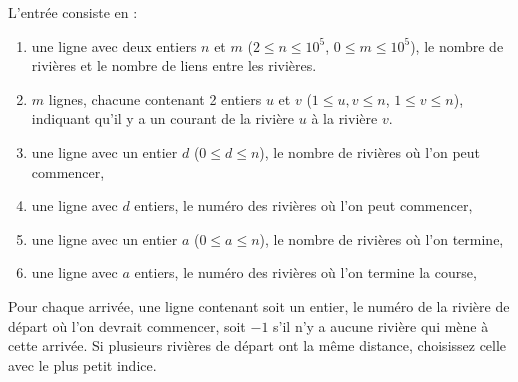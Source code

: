 \begin{Input}
    L'entrée consiste en :
    \begin{enumerate}
        \item une ligne avec deux entiers $n$ et $m$ ($2 \le n \le 10^5$, $0 \le m \le 10^5$), le nombre de rivières et le nombre de liens entre les rivières.
        \item $m$ lignes, chacune contenant 2 entiers $u$ et $v$ ($1 \le u,v \le n$, $1 \le v \le n$), indiquant qu'il y a un courant de la rivière $u$ à la rivière $v$.
        \item une ligne avec un entier $d$ ($0 \le d \le n$), le nombre de rivières où l'on peut commencer,
        \item une ligne avec $d$ entiers, le numéro des rivières où l'on peut commencer,
        \item une ligne avec un entier $a$ ($ 0 \le a \le n$), le nombre de rivières où l'on termine,
        \item une ligne avec $a$ entiers, le numéro des rivières où l'on termine la course,
    \end{enumerate}
\end{Input}

\begin{Output}
    Pour chaque arrivée, une ligne contenant soit un entier, le numéro de la rivière de départ où l'on devrait commencer, soit $-1$ s'il n'y a aucune rivière qui mène à cette arrivée. Si plusieurs rivières de départ ont la même distance, choisissez celle avec le plus petit indice.
\end{Output}

